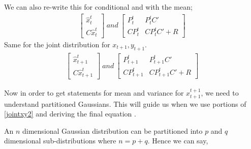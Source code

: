 \documentclass[a4paper,11pt]{article}
\begin{document}
We can also re-write this for conditional and with the mean;
\begin{eqnarray}
\left[ \begin{array}{c}
      \hat{x}_{t}^t \\
      C\hat{x}_{t}^t
      \end{array} \right]
\:and\:      
\left[ \begin{array}{cc}
      P_{t}^t & P_{t}^tC' \\
      CP_{t}^t & CP_{t}^tC'+R
      \end{array} \right] \label{jointxy}
\end{eqnarray}
Same for the joint distribution for $x_{t+1}, y_{t+1}$.
\begin{eqnarray}
\left[ \begin{array}{c}
      \hat{x}_{t+1}^t \\
      C\hat{x}_{t+1}^t
      \end{array} \right]
\:and\:      
\left[ \begin{array}{cc}
      P_{t+1}^t & P_{t+1}^tC' \\
      CP_{t+1}^t & CP_{t+1}^tC'+R
      \end{array} \right] \label{jointxy2}
\end{eqnarray}

Now in order to get statements for mean and variance for $x_{t+1}^{t+1}$, we
need to understand partitioned Gaussians. This will guide us when we use
portions of \eqref{jointxy2} and deriving the final equation \cite{jordan}. 

An $n$ dimensional Gaussian distribution can be partitioned into $p$ and $q$
dimensional sub-distributions where $n = p + q$. Hence we can say,
\end{document}
